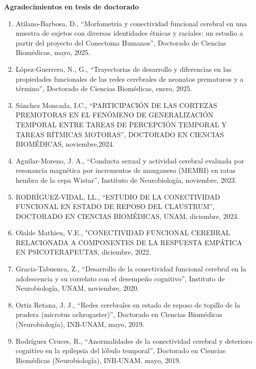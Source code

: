 {\large \textbf{\color{red}Agradecimientos en tesis de doctorado}}

\begin{enumerate}

\item Atilano-Barbosa, D., “Morfometría y conectividad funcional cerebral en una muestra de sujetos 
con 
diversas identidades étnicas y raciales: un estudio a partir del proyecto del Conectoma Humanos”, 
Doctorado de Ciencias Biomédicas, mayo, 2025.

\item López-Guerrero, N., G., “Trayectorias de desarrollo y diferencias en las propiedades 
funcionales 
de las redes cerebrales de neonatos prematuros y a término”, Doctorado de Ciencias Biomédicas, enero, 2025.

\item Sánchez Moncada, I.C., “PARTICIPACIÓN DE LAS CORTEZAS PREMOTORAS EN EL FENÓMENO DE 
GENERALIZACIÓN 
TEMPORAL ENTRE TAREAS DE PERCEPCIÓN TEMPORAL Y TAREAS RÍTMICAS MOTORAS”, DOCTORADO EN CIENCIAS 
BIOMÉDICAS, noviembre,2024.

\item Aguilar-Moreno, J. A., “Conducta sexual y actividad cerebral evaluada por resonancia magnética por incrementos de manganeso (MEMRI) en ratas hembra de 
la 
cepa Wistar”, Instituto de Neurobiología, noviembre, 2023.

\item RODRÍGUEZ-VIDAL, LL., “ESTUDIO DE LA CONECTIVIDAD FUNCIONAL EN ESTADO DE REPOSO DEL CLAUSTRUM”, DOCTORADO EN CIENCIAS BIOMÉDICAS, UNAM, diciembre, 2023.

\item Olalde Mathieu, V.E., "CONECTIVIDAD FUNCIONAL CEREBRAL RELACIONADA A COMPONENTES DE LA RESPUESTA EMPÁTICA EN PSICOTERAPEUTAS, diciembre, 2022.

\item Gracia-Tabuenca, Z., “Desarrollo de la conectividad funcional cerebral en la adolescencia y su correlato con el desempeño cognitivo”, Instituto de 
Neurobiología, UNAM, noviembre, 2020.

\item Ortiz Retana, J. J., “Redes cerebrales en estado de reposo de topillo de la pradera (microtus ochrogaster)”, Doctorado en Ciencias Biomédicas 
(Neurobiología), INB-UNAM, mayo, 2019.

\item Rodríguez Cruces, R., “Anormalidades de la conectividad cerebral y deterioro cognitivo en la epilepsia del lóbulo temporal”, Doctorado en Ciencias 
Biomédicas (Neurobiología), INB-UNAM, mayo, 2019.


\end{enumerate}
